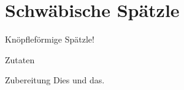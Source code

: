 \section{Schwäbische Spätzle}\label{rcp:schwaebische-spaetzle}

\begin{recipeintro}
  Knöpfleförmige Spätzle!
\end{recipeintro}

\begin{ingredients}
  {Zutaten}

\end{ingredients}

\vspace{0.5cm}

\begin{recipestep}
  {Zubereitung}
  Dies und das.
\end{recipestep}
